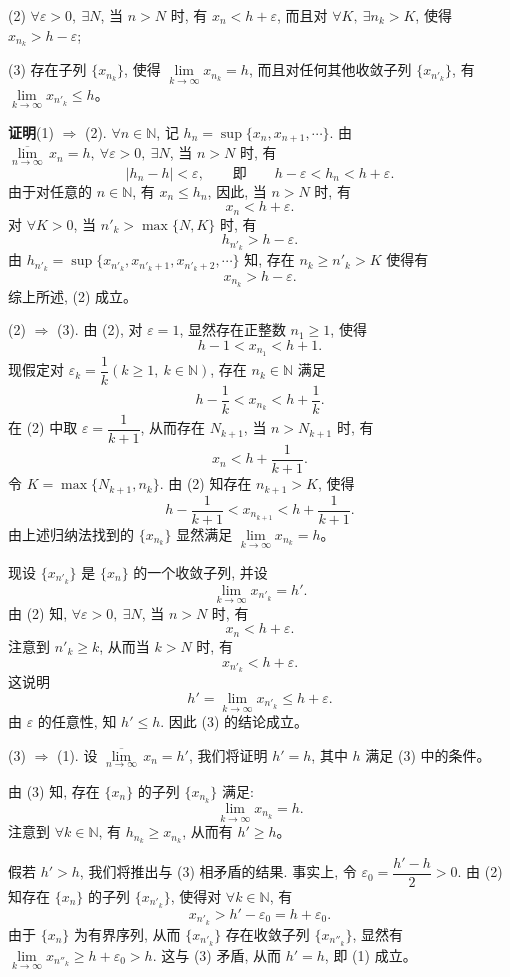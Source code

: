 \documentclass[UTF8, 12pt, fontset=fandol, oneside]{ctexart}
\begin{document}
(2) $\forall\varepsilon>0,\ \exists N$, 当 $n>N$ 时, 有 $x_n<h+\varepsilon$, 而且对 $\forall K,\ \exists n_k>K$, 使得 $x_{n_k}>h-\varepsilon$;

(3) 存在子列 $\{x_{n_k}\}$, 使得 $\lim\limits_{k\to\infty}x_{n_k}=h$, 而且对任何其他收敛子列 $\{x_{n'_k}\}$, 有 $\lim\limits_{k\to\infty}x_{n'_k}\leqslant h$。

\noindent\textbf{证明}\quad (1) $\Rightarrow$ (2). $\forall n\in\mathbb{N}$, 记 $h_n=\sup\{x_n,x_{n+1},\cdots\}$. 由 $\overline{\lim\limits_{n\to\infty}}\,x_n=h,\ \forall\varepsilon>0,\ \exists N$, 当 $n>N$ 时, 有
\[
  |h_n-h|<\varepsilon,
  \qquad\text{即}\qquad h-\varepsilon<h_n<h+\varepsilon.
\]
由于对任意的 $n\in\mathbb{N}$, 有 $x_n\leqslant h_n$, 因此, 当 $n>N$ 时, 有
\[
  x_n<h+\varepsilon.
\]
对 $\forall K>0$, 当 $n'_k>\max\{N,K\}$ 时, 有
\[
  h_{n'_k}>h-\varepsilon.
\]
由 $h_{n'_k}=\sup\{x_{n'_k},x_{n'_k+1},x_{n'_k+2},\cdots\}$ 知, 存在 $n_k\geqslant n'_k>K$ 使得有
\[
  x_{n_k}>h-\varepsilon.
\]
综上所述, (2) 成立。

(2) $\Rightarrow$ (3). 由 (2), 对 $\varepsilon=1$, 显然存在正整数 $n_1\geqslant1$, 使得
\[
  h-1<x_{n_1}<h+1.
\]
现假定对 $\varepsilon_k=\dfrac1k(k\geqslant1,\ k\in\mathbb{N})$, 存在 $n_k\in\mathbb{N}$ 满足
\[
  h-\frac1k<x_{n_k}<h+\frac1k.
\]
在 (2) 中取 $\varepsilon=\dfrac1{k+1}$, 从而存在 $N_{k+1}$, 当 $n>N_{k+1}$ 时, 有
\[
  x_n<h+\frac1{k+1}.
\]
令 $K=\max\{N_{k+1},n_k\}$. 由 (2) 知存在 $n_{k+1}>K$, 使得
\[
  h-\frac1{k+1}<x_{n_{k+1}}<h+\frac1{k+1}.
\]
由上述归纳法找到的 $\{x_{n_k}\}$ 显然满足 $\lim\limits_{k\to\infty}x_{n_k}=h$。

现设 $\{x_{n'_k}\}$ 是 $\{x_n\}$ 的一个收敛子列, 并设
\[
  \lim_{k\to\infty}x_{n'_k}=h'.
\]
由 (2) 知, $\forall\varepsilon>0,\ \exists N$, 当 $n>N$ 时, 有
\[
  x_n<h+\varepsilon.
\]
注意到 $n'_k\geqslant k$, 从而当 $k>N$ 时, 有
\[
  x_{n'_k}<h+\varepsilon.
\]
这说明
\[
  h'=\lim_{k\to\infty}x_{n'_k}\leqslant h+\varepsilon.
\]
由 $\varepsilon$ 的任意性, 知 $h'\leqslant h$. 因此 (3) 的结论成立。

(3) $\Rightarrow$ (1). 设 $\overline{\lim\limits_{n\to\infty}}\,x_n=h'$, 我们将证明 $h'=h$, 其中 $h$ 满足 (3) 中的条件。

由 (3) 知, 存在 $\{x_n\}$ 的子列 $\{x_{n_k}\}$ 满足:
\[
  \lim_{k\to\infty}x_{n_k}=h.
\]
注意到 $\forall k\in\mathbb{N}$, 有 $h_{n_k}\geqslant x_{n_k}$, 从而有 $h'\geqslant h$。

假若 $h'>h$, 我们将推出与 (3) 相矛盾的结果. 事实上, 令 $\varepsilon_0=\dfrac{h'-h}{2}>0$. 由 (2) 知存在 $\{x_n\}$ 的子列 $\{x_{n'_k}\}$, 使得对 $\forall k\in\mathbb{N}$, 有
\[
  x_{n'_k}>h'-\varepsilon_0=h+\varepsilon_0.
\]
由于 $\{x_n\}$ 为有界序列, 从而 $\{x_{n'_k}\}$ 存在收敛子列 $\{x_{n''_k}\}$, 显然有 $\lim\limits_{k\to\infty}x_{n''_k}\geqslant h+\varepsilon_0>h$. 这与 (3) 矛盾, 从而 $h'=h$, 即 (1) 成立。
\end{document}
